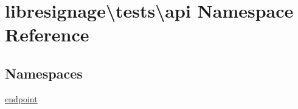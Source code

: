 \hypertarget{namespacelibresignage_1_1tests_1_1api}{}\section{libresignage\textbackslash{}tests\textbackslash{}api Namespace Reference}
\label{namespacelibresignage_1_1tests_1_1api}
\subsection*{Namespaces}
\begin{DoxyCompactItemize}
\item 
 \hyperlink{namespacelibresignage_1_1tests_1_1api_1_1endpoint}{endpoint}
\end{DoxyCompactItemize}
